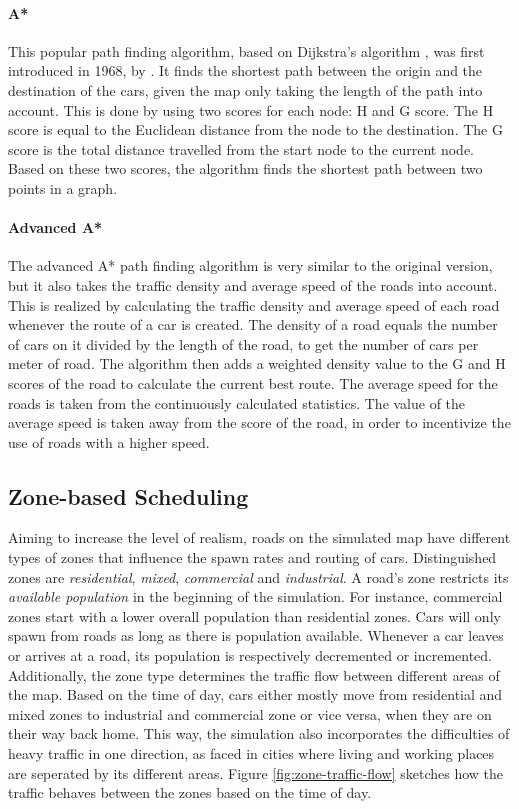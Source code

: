 \documentclass[10pt]{article}
\begin{document}
\paragraph{A*}
This popular path finding algorithm, based on Dijkstra’s algorithm \citep{dijkstra1959note}, was first introduced in 1968, by \citet{hart1968formal}. It finds the shortest path between the origin and the destination of the cars, given the map only taking the length of the path into account. This is done by using two scores for each node: H and G score. The H score is equal to the Euclidean distance from the node to the destination. The G score is the total distance travelled from the start node to the current node. Based on these two scores, the algorithm finds the shortest path between two points in a graph. 

\paragraph{Advanced A*}
The advanced A* path finding algorithm is very similar to the original version, but it also takes the traffic density and average speed of the roads into account. This is realized by calculating the traffic density and average speed of each road whenever the route of a car is created. The density of a road equals the number of cars on it divided by the length of the road, to get the number of cars per meter of road. The algorithm then adds a weighted density value to the G and H scores of the road to calculate the current best route. The average speed for the roads is taken from the continuously calculated statistics. The value of the average speed is taken away from the score of the road, in order to incentivize the use of roads with a higher speed.

\subsection{Zone-based Scheduling}
Aiming to increase the level of realism, roads on the simulated map have different types of zones that influence the spawn rates and routing of cars. Distinguished zones are \textit{residential}, \textit{mixed}, \textit{commercial} and \textit{industrial}. A road's zone restricts its \textit{available population} in the beginning of the simulation. For instance, commercial zones start with a lower overall population than residential zones. Cars will only spawn from roads as long as there is population available. Whenever a car leaves or arrives at a road, its population is respectively decremented or incremented. Additionally, the zone type determines the traffic flow between different areas of the map. Based on the time of day, cars either mostly move from residential and mixed zones to industrial and commercial zone or vice versa, when they are on their way back home. This way, the simulation also incorporates the difficulties of heavy traffic in one direction, as faced in cities where living and working places are seperated by its different areas. Figure \ref{fig:zone-traffic-flow} sketches how the traffic behaves between the zones based on the time of day.
\end{document}
